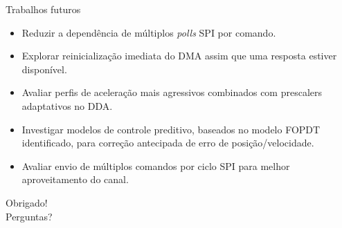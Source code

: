 \documentclass[aspectratio=169]{beamer}
\begin{document}
\begin{frame}{Trabalhos futuros}
  \begin{itemize}
    \item Reduzir a dependência de múltiplos \emph{polls} SPI por comando.
    \item Explorar reinicialização imediata do DMA assim que uma resposta estiver disponível.
    \item Avaliar perfis de aceleração mais agressivos combinados com prescalers adaptativos no DDA.
    \item Investigar modelos de controle preditivo, baseados no modelo FOPDT identificado, para correção antecipada de erro de posição/velocidade.
    \item Avaliar envio de múltiplos comandos por ciclo SPI para melhor aproveitamento do canal.
  \end{itemize}
\end{frame}

\begin{frame}[plain]
  \centering
  \vfill
  {\LARGE Obrigado!}\\[1em]
  \large Perguntas?
  \vfill
\end{frame}
\end{document}
